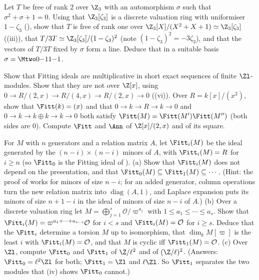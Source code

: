 \begin{exercise}\label{ex:modules:ex-IV}
Let $T$ be free of rank $2$ over $\Z_3$ with an automorphism $\sigma$ such that $\sigma^2+\sigma+1=0$. Using that $\Z_3[\zeta_3]$ is a discrete valuation ring with uniformiser
$1-\zeta_3$ (), show that $T$ is free of rank one over $\Z_3[X]/(X^2+X+1)\simeq\Z_3[\zeta_3]$ ((iii)), that
$T/3T\simeq\Z_3[\zeta_3]/(1-\zeta_3)^2$ (note $(1-\zeta_3)^2=-3\zeta_3$), and that the vectors of $T/3T$ fixed by $\sigma$ form a line. Deduce that in a suitable basis
$\sigma=\Mtwo0{-1}1{-1}$.
\end{exercise}

\begin{exercise}\label{ex:modules:ex-fitting}
Show that Fitting ideals are multiplicative in short exact sequences of finite $\Zl$-modules. Show that they are not over $\Z[x]$, using
$0\to R/(2,x)\to R/(4,x)\to R/(2,x)\to0$ ((vi)). Over $R=k[x]/(x^2)$, show that $\Fitt(k)=(x)$ and that
$0\to k\to R\to k\to0$ and $0\to k\to k\oplus k\to k\to0$ both satisfy $\Fitt(M)=\Fitt(M')\Fitt(M'')$ (both sides are $0$). Compute $\Fitt$ and $\Ann$ of $\Z[x]/(2,x)$ and of its
square.
\end{exercise}

\begin{exercise}\label{ex:modules:ex-fitting-i}
For $M$ with $n$ generators and a relation matrix $A$, let $\Fitt_i(M)$ be the ideal generated by the $(n-i)\times(n-i)$ minors of $A$, with $\Fitt_i(M)=R$
for $i\ge n$ (so $\Fitt_0$ is the Fitting ideal of ).
(a) Show that $\Fitt_i(M)$ does not depend on the presentation, and that $\Fitt_0(M)\subseteq\Fitt_1(M)\subseteq\cdots$. (Hint: the proof of
 works for minors of size $n-i$; for an added generator, column operations turn the new relation matrix into
$\operatorname{diag}(A,1)$, and Laplace expansion puts its minors of size $n+1-i$ in the ideal of minors of size $n-i$ of $A$.)
(b) Over a discrete valuation ring let $M=\bigoplus_{j=1}^s\mathcal O/\varpi^{a_j}$ with $1\le a_1\le\cdots\le a_s$. Show that $\Fitt_i(M)=\varpi^{a_1+\cdots+a_{s-i}}\mathcal O$
for $i<s$ and $\Fitt_i(M)=\mathcal O$ for $i\ge s$. Deduce that the $\Fitt_i$ determine a torsion $M$ up to isomorphism, that $\dim_kM[\varpi]$ is the least
$i$ with $\Fitt_i(M)=\mathcal O$, and that $M$ is cyclic iff $\Fitt_1(M)=\mathcal O$.
(c) Over $\Zl$, compute $\Fitt_0$ and $\Fitt_1$ of $\Z/\ell^2$ and of $(\Z/\ell)^2$. (Answers: $\Fitt_0=\ell^2\Zl$ for both; $\Fitt_1=\Zl$ and $\ell\Zl$. So $\Fitt_1$
separates the two modules that (iv) shows $\Fitt_0$ cannot.)
\end{exercise}

